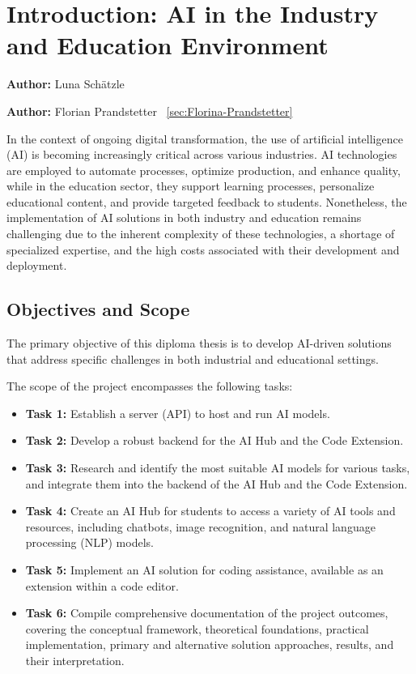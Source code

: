 \chapter{Introduction: AI in the Industry and Education Environment}
\label{chap:introduction}
\textbf{Author:} Luna Schätzle

\textbf{Author:} Florian Prandstetter ~\ref{sec:Florina-Prandstetter}

In the context of ongoing digital transformation, the use of artificial intelligence (AI) is becoming increasingly critical across various industries. 
AI technologies are employed to automate processes, optimize production, and enhance quality, while in the education sector, they support learning processes, 
personalize educational content, and provide targeted feedback to students. Nonetheless, 
the implementation of AI solutions in both industry and education remains challenging due to the inherent complexity of these technologies, a shortage of specialized expertise, 
and the high costs associated with their development and deployment.

\section{Objectives and Scope}

The primary objective of this diploma thesis is to develop AI-driven solutions that address specific challenges in both industrial and educational settings.

The scope of the project encompasses the following tasks:
\begin{itemize}
    \item \textbf{Task 1:} Establish a server (API) to host and run AI models.
    \item \textbf{Task 2:} Develop a robust backend for the AI Hub and the Code Extension.
    \item \textbf{Task 3:} Research and identify the most suitable AI models for various tasks, and integrate them into the backend of the AI Hub and the Code Extension.
    \item \textbf{Task 4:} Create an AI Hub for students to access a variety of AI tools and resources, including chatbots, image recognition, and natural language processing (NLP) models.
    \item \textbf{Task 5:} Implement an AI solution for coding assistance, available as an extension within a code editor.
    \item \textbf{Task 6:} Compile comprehensive documentation of the project outcomes, covering the conceptual framework, theoretical foundations, practical implementation, primary and alternative solution approaches, results, and their interpretation.
\end{itemize}

